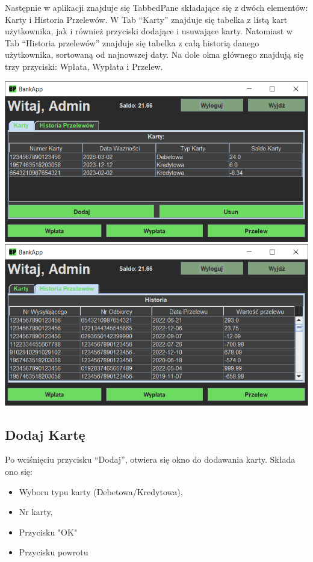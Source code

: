 \documentclass[12pt, letterpaper]{article}
\begin{document}
\quad Następnie w aplikacji znajduje się TabbedPane składające się z dwóch elementów: Karty i Historia Przelewów.
W Tab “Karty” znajduje się tabelka z listą kart użytkownika, jak i również przyciski dodające i usuwające karty.
Natomiast w Tab “Historia przelewów” znajduje się tabelka z całą historią danego użytkownika, sortowaną od najnowszej daty.
Na dole okna głównego znajdują się trzy przyciski: Wpłata, Wypłata i Przelew.


\begin{center}
	\includegraphics[scale=0.5]{mainkarty}
	\includegraphics[scale=0.5]{mainhistoria}
\end{center}

\subsection{Dodaj Kartę}

\quad Po wciśnięciu przycisku “Dodaj”, otwiera się okno do dodawania karty.
Składa ono się:

\begin{itemize}
\item Wyboru typu karty (Debetowa/Kredytowa),
\item Nr karty,
\item Przycisku "OK"
\item Przycisku powrotu
\end{itemize}
\end{document}
